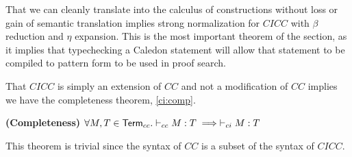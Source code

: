 That we can cleanly translate into the calculus of constructions without loss or gain of 
semantic translation implies strong normalization for $CICC$ with $\beta$ reduction and 
 $\eta$ expansion.  This is the most important theorem of the section, as it implies that typechecking a Caledon 
statement will allow that statement to be compiled to pattern form to be used in proof search.  

That $CICC$ is simply an extension of $CC$ and not a modification of $CC$ implies we have the completeness theorem, \ref{ci:comp}.

\begin{theorem}
\textbf{(Completeness)}  $\forall M,T \in \mathsf{Term}_{cc}. \vdash_{cc} M : T \implies \vdash_{ci} M : T$
\label{ci:comp}
\end{theorem}

This theorem is trivial since the syntax of $CC$ is a subset of the syntax of $CICC$.
